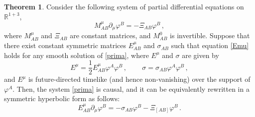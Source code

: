 \documentclass[aps,prl,singlecolumn,nofootinbib]{revtex4-2}
\theoremstyle{definition}
\theoremstyle{theorem}
\newtheorem{theorem}{Theorem}
\begin{document}
\begin{theorem}\label{theo}
Consider the following system of partial differential equations on $\mathbb{R}^{1+3}$,
\begin{equation}\label{prima}
M^\mu_{AB}\partial_\mu \varphi^B = -\Xi_{AB} \varphi^B \, ,
\end{equation}
where $M^\mu_{AB}$ and $\Xi_{AB}$ are constant
matrices, and $M^0_{AB}$ is invertible. Suppose that there exist constant symmetric matrices $E^\mu_{AB}$ and $\sigma_{AB}$ such that equation \eqref{Emu} holds for any smooth solution of \eqref{prima}, 
where $E^\mu$ and $\sigma$ are given by
\begin{equation}\label{second}
 E^\mu= \dfrac{1}{2} E^\mu_{AB} \varphi^A \varphi^B\,, \, \qquad  
 \sigma =  \sigma_{AB} \varphi^A \varphi^B \,,
\end{equation}
and $E^\mu$ is future-directed timelike (and hence non-vanishing) over the support of $\varphi^A$. Then, the system \eqref{prima} is causal, and it can be equivalently rewritten in a symmetric hyperbolic form as follows:
\begin{equation}\label{cinque}
E^\mu_{AB} \partial_\mu \varphi^B = -\sigma_{AB} \varphi^B - \Xi_{[AB]}\varphi^B \,. 
\end{equation} 
\end{theorem}
\end{document}
